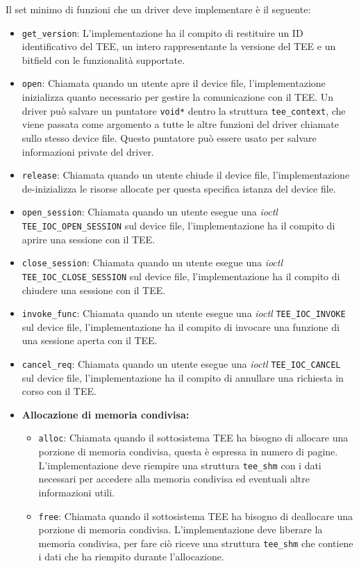 \documentclass[12pt,italian]{report}
\begin{document}
Il set minimo di funzioni che un driver deve implementare è il seguente:
\begin{itemize}
    \item \texttt{get\_version}: L'implementazione ha il compito di restituire
        un ID identificativo del TEE, un intero rappresentante la versione
        del TEE e un bitfield con le funzionalità supportate.
    \item \texttt{open}: Chiamata quando un utente apre il device file,
        l'implementazione inizializza quanto necessario per gestire la
        comunicazione con il TEE.
        Un driver può salvare un puntatore \texttt{void*} dentro la struttura
        \texttt{tee\_context}, che viene passata come argomento a tutte le
        altre funzioni del driver chiamate sullo stesso device file.
        Questo puntatore può essere usato per salvare informazioni private
        del driver.
    \item \texttt{release}: Chiamata quando un utente chiude il device file,
        l'implementazione de-inizializza le risorse allocate per questa
        specifica istanza del device file.
    \item \texttt{open\_session}: Chiamata quando un utente esegue una
        \textit{ioctl} \texttt{TEE\_IOC\_OPEN\_SESSION} sul device file,
        l'implementazione ha il compito di aprire una sessione con il TEE.
    \item \texttt{close\_session}: Chiamata quando un utente esegue una
        \textit{ioctl} \texttt{TEE\_IOC\_CLOSE\_SESSION} sul device file,
        l'implementazione ha il compito di chiudere una sessione con il TEE.
    \item \texttt{invoke\_func}: Chiamata quando un utente esegue una
        \textit{ioctl} \texttt{TEE\_IOC\_INVOKE} sul device file,
        l'implementazione ha il compito di invocare una funzione di una
        sessione aperta con il TEE.
    \item \texttt{cancel\_req}: Chiamata quando un utente esegue una
        \textit{ioctl} \texttt{TEE\_IOC\_CANCEL} sul device file,
        l'implementazione ha il compito di annullare una richiesta in
        corso con il TEE.
    \item \textbf{Allocazione di memoria condivisa: }
    \begin{itemize}
        \item \texttt{alloc}: Chiamata quando il sottosistema TEE ha
            bisogno di allocare una porzione di memoria condivisa,
            questa è espressa in numero di pagine.
            L'implementazione deve riempire una struttura \texttt{tee\_shm}
            con i dati necessari per accedere alla memoria condivisa ed
            eventuali altre informazioni utili.
        \item \texttt{free}: Chiamata quando il sottosistema TEE ha
            bisogno di deallocare una porzione di memoria condivisa.
            L'implementazione deve liberare la memoria condivisa, per
            fare ciò riceve una struttura \texttt{tee\_shm} che contiene
            i dati che ha riempito durante l'allocazione.
    \end{itemize}
\end{itemize}
\end{document}
